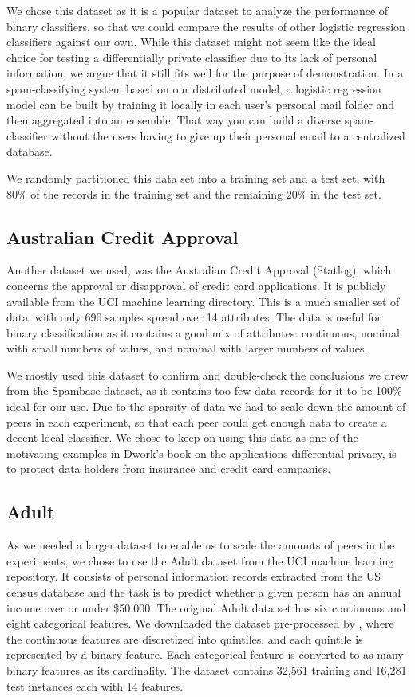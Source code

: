 We chose this dataset as it is a popular dataset to analyze the performance of binary classifiers, so that we could compare the results of other logistic regression classifiers against our own. While this dataset might not seem like the ideal choice for testing a differentially private classifier due to its lack of personal information, we argue that it still fits well for the purpose of demonstration. In a spam-classifying system based on our distributed model, a logistic regression model can be built by training it locally in each user's personal mail folder and then aggregated into an ensemble. That way you can build a diverse spam-classifier without the users having to give up their personal email to a centralized database.     

We randomly partitioned this data set into a training set and a test set, with 80\% of the records in the training set and the remaining 20\% in the test set.

\subsection{Australian Credit Approval}
Another dataset we used, was the Australian Credit Approval (Statlog), which concerns the approval or disapproval of credit card applications. It is publicly available from the UCI machine learning directory. This is a much smaller set of data, with only 690 samples spread over 14 attributes. The data is useful for binary classification as it contains a good mix of attributes: continuous, nominal with small numbers of values, and nominal with larger numbers of values.

We mostly used this dataset to confirm and double-check the conclusions we drew from the Spambase dataset, as it contains too few data records for it to be 100\% ideal for our use. Due to the sparsity of data we had to scale down the amount of peers in each experiment, so that each peer could get enough data to create a decent local classifier. We chose to keep on using this data as one of the motivating examples in Dwork's book\citep{dwork2013algorithmic} on the applications differential privacy, is to protect data holders from insurance and credit card companies. 


\subsection{Adult}
As we needed a larger dataset to enable us to scale the amounts of peers in the experiments, we chose to use the Adult dataset from the UCI machine learning repository.  It consists of personal information records extracted from the US census database and the task is to predict whether a given person has an annual income over or under \$50,000. The original Adult data set has six continuous and eight categorical features. We
downloaded the dataset pre-processed by \cite{platt1999fast}, where the continuous features are discretized into quintiles, and each quintile is represented by a binary feature. Each categorical feature is converted to as many binary features as its cardinality. The dataset contains 32,561 training and 16,281 test instances each with 14 features.

